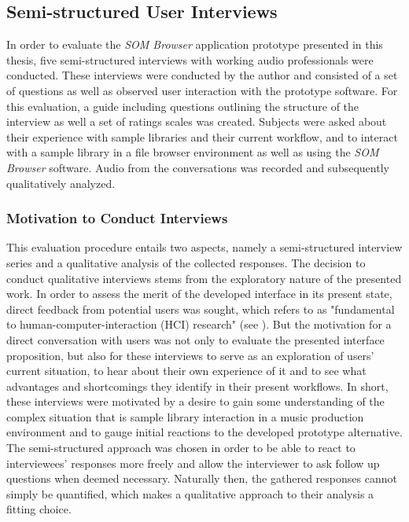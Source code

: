 \subsection{Semi-structured User Interviews}
\label{subsec:evaluation_interviews}
In order to evaluate the \textit{SOM Browser} application prototype presented in
this thesis, five semi-structured interviews with working audio professionals
were conducted. These interviews were conducted by the author and consisted of a
set of questions as well as observed user interaction with the prototype
software. For this evaluation, a guide including questions outlining the
structure of the interview as well a set of ratings scales was created. Subjects
were asked about their experience with sample libraries and their current
workflow, and to interact with a sample library in a file browser environment as
well as using the \textit{SOM Browser} software. Audio from the conversations
was recorded and subsequently qualitatively analyzed.

\subsubsection{Motivation to Conduct Interviews}
\label{subsubsec:interview_motivation}
This evaluation procedure entails two aspects, namely a semi-structured
interview series and a qualitative analysis of the collected responses. The
decision to conduct qualitative interviews stems from the exploratory nature of
the presented work. In order to assess the merit of the developed interface in
its present state, direct feedback from potential users was sought, which
\citet{lazar2017} refers to as "fundamental to human-computer-interaction (HCI)
research" (see \citet[p.187]{lazar2017}). But the motivation for a direct
conversation with users was not only to evaluate the presented interface
proposition, but also for these interviews to serve as an exploration of users'
current situation, to hear about their own experience of it and to see what
advantages and shortcomings they identify in their present workflows. In short,
these interviews were motivated by a desire to gain some understanding of the
complex situation that is sample library interaction in a music production
environment and to gauge initial reactions to the developed prototype
alternative. The semi-structured approach was chosen in order to be able to
react to interviewees' responses more freely and allow the interviewer to ask
follow up questions when deemed necessary. Naturally then, the gathered
responses cannot simply be quantified, which makes a qualitative approach to
their analysis a fitting choice.

